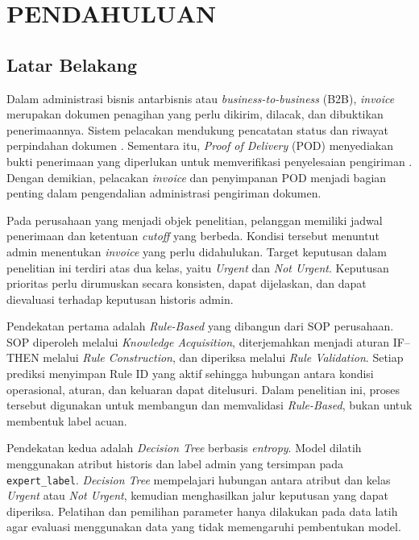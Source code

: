 \chapter{PENDAHULUAN}

\section{Latar Belakang}

Dalam administrasi bisnis antarbisnis atau \textit{business-to-business} (B2B), \textit{invoice} merupakan dokumen penagihan yang perlu dikirim, dilacak, dan dibuktikan penerimaannya. Sistem pelacakan mendukung pencatatan status dan riwayat perpindahan dokumen \cite{10.1007/978-3-642-55032-4_33}. Sementara itu, \textit{Proof of Delivery} (POD) menyediakan bukti penerimaan yang diperlukan untuk memverifikasi penyelesaian pengiriman \cite{gunadhya_rajawali_logistik_2021}. Dengan demikian, pelacakan \textit{invoice} dan penyimpanan POD menjadi bagian penting dalam pengendalian administrasi pengiriman dokumen.

Pada perusahaan yang menjadi objek penelitian, pelanggan memiliki jadwal penerimaan dan ketentuan \textit{cutoff} yang berbeda. Kondisi tersebut menuntut admin menentukan \textit{invoice} yang perlu didahulukan. Target keputusan dalam penelitian ini terdiri atas dua kelas, yaitu \textit{Urgent} dan \textit{Not Urgent}. Keputusan prioritas perlu dirumuskan secara konsisten, dapat dijelaskan, dan dapat dievaluasi terhadap keputusan historis admin.

Pendekatan pertama adalah \textit{Rule-Based} yang dibangun dari SOP perusahaan. SOP diperoleh melalui \textit{Knowledge Acquisition}, diterjemahkan menjadi aturan IF--THEN melalui \textit{Rule Construction}, dan diperiksa melalui \textit{Rule Validation}. Setiap prediksi menyimpan Rule ID yang aktif sehingga hubungan antara kondisi operasional, aturan, dan keluaran dapat ditelusuri. Dalam penelitian ini, proses tersebut digunakan untuk membangun dan memvalidasi \textit{Rule-Based}, bukan untuk membentuk label acuan.

Pendekatan kedua adalah \textit{Decision Tree} berbasis \textit{entropy}. Model dilatih menggunakan atribut historis dan label admin yang tersimpan pada \texttt{expert\_label}. \textit{Decision Tree} mempelajari hubungan antara atribut dan kelas \textit{Urgent} atau \textit{Not Urgent}, kemudian menghasilkan jalur keputusan yang dapat diperiksa. Pelatihan dan pemilihan parameter hanya dilakukan pada data latih agar evaluasi menggunakan data yang tidak memengaruhi pembentukan model.

